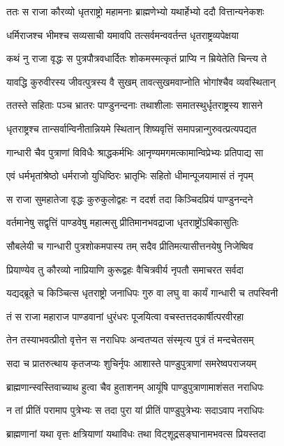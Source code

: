 \twolineshloka
{ततः स राजा कौरव्यो धृतराष्ट्रो महामनाः}
{ब्राह्मणेभ्यो यथार्हेभ्यो ददौ वित्तान्यनेकशः}


\twolineshloka
{धर्मिराजश्च भीमश्च सव्यसाची यमावपि}
{तत्सर्वमन्ववर्तन्त धृतराष्ट्रव्यपेक्षया}


\twolineshloka
{कथं नु राजा वृद्धः स पुत्रपौत्रवधार्दितः}
{शोकमस्मत्कृतं प्राप्यि न म्रियेतेति चिन्त्य ते}


\twolineshloka
{यावद्धि कुरुवीरस्य जीवत्पुत्रस्य वै सुखम्}
{तावत्सुखमवाप्नोति भोगांश्चैव व्यवस्थितान्}


\twolineshloka
{ततस्ते सहिताः पञ्च भ्रातरः पाण्डुनन्दनाः}
{तथाशीलाः समातस्थुर्धृतराष्ट्रस्य शासने}


\twolineshloka
{धृतराष्ट्रश्च तान्सर्वान्विनीतान्नियमे स्थितान्}
{शिष्यवृत्तिं समापन्नान्गुरुवत्प्रत्यपद्यत}


\twolineshloka
{गान्धारी चैव पुत्राणां विविधैः श्राद्धकर्मभिः}
{आनृण्यमगमत्कामान्विप्रेभ्यः प्रतिपाद्य सा}


\twolineshloka
{एवं धर्मभृतांश्रेष्ठो धर्मराजो युधिष्ठिरः}
{भ्रातृभिः सहितो धीमान्पूजयामासं तं नृपम्}


\twolineshloka
{स राजा सुमहातेजा वृद्धः कुरुकुलोद्वहः}
{न ददर्श तदा किञ्चिदप्रियं पाण्डुनन्दने}


\twolineshloka
{वर्तमानेषु सद्वृत्तिं पाण्डवेषु महात्मसु}
{प्रीतिमानभवद्राजा धृतराष्ट्रोंऽबिकासुतिः}


\twolineshloka
{सौबलेयी च गान्धारी पुत्रशोकमपास्य तम्}
{सदैव प्रीतिमत्यासीत्तनयेषु निजेष्विव}


\twolineshloka
{प्रियाण्येव तु कौरव्यो नाप्रियाणि कुरूद्वहः}
{वैचित्रवीर्य नृपतौ समाचरत सर्वदा}


\twolineshloka
{यद्यद्ब्रूते च किञ्चित्स धृतराष्ट्रो जनाधिपः}
{गुरु वा लघु वा कार्यं गान्धारी च तपस्विनी}


\twolineshloka
{तं स राजा महाराज पाण्डवानां धुरंधरः}
{पूजयित्वा वचस्तत्तदकार्षीत्परवीरहा}


\twolineshloka
{तेन तस्याभवत्प्रीतो वृत्तेन स नराधिपः}
{अन्वतप्यत संस्मृत्य पुत्रं तं मन्दचेतसम्}


\twolineshloka
{सदा च प्रातरुत्थाय कृतजप्यः शुचिर्नृपः}
{आशास्ते पाण्डुपुत्राणां समरेष्वपराजयम्}


\twolineshloka
{ब्राह्मणान्स्वस्तिवाच्याथ हुत्वा चैव हुताशनम्}
{आयूंषि पाण्डुपुत्राणामाशंसत नराधिपः}


\threelineshloka
{न तां प्रीतिं परामाप पुत्रेभ्यः स तदा पुरा}
{यां प्रीतिं पाण्डुपुत्रेभ्यः सदाऽवाप नराधिपः}
{}


\twolineshloka
{ब्राह्मणानां यथा वृत्तः क्षत्रियाणां यथाविधः}
{तथा विट्शूद्रसङ्घानामभवत्स प्रियस्तदा}


